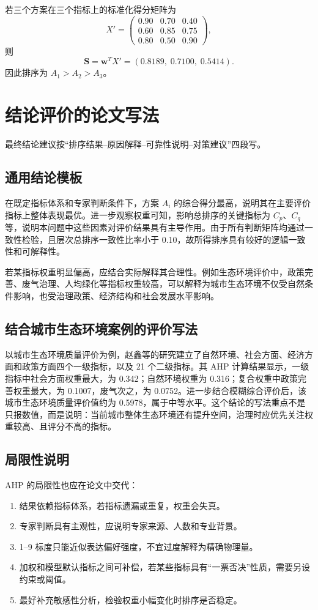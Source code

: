 \documentclass[UTF8,zihao=-4,fontset=none]{ctexart}
\begin{document}
若三个方案在三个指标上的标准化得分矩阵为
\begin{equation}
X'=\begin{pmatrix}
0.90&0.70&0.40\\
0.60&0.85&0.75\\
0.80&0.50&0.90
\end{pmatrix},
\end{equation}
则
\begin{equation}
\bm S=\bm w^T X'=(0.8189,\;0.7100,\;0.5414).
\end{equation}
因此排序为 $A_1>A_2>A_3$。

\section{结论评价的论文写法}
最终结论建议按“排序结果--原因解释--可靠性说明--对策建议”四段写。

\subsection{通用结论模板}
在既定指标体系和专家判断条件下，方案 $A_i$ 的综合得分最高，说明其在主要评价指标上整体表现最优。进一步观察权重可知，影响总排序的关键指标为 $C_p$、$C_q$ 等，说明本问题中这些因素对评价结果具有主导作用。由于所有判断矩阵均通过一致性检验，且层次总排序一致性比率小于 0.10，故所得排序具有较好的逻辑一致性和可解释性。

若某指标权重明显偏高，应结合实际解释其合理性。例如生态环境评价中，政策完善、废气治理、人均绿化等指标权重较高，可以解释为城市生态环境不仅受自然条件影响，也受治理政策、经济结构和社会发展水平影响。

\subsection{结合城市生态环境案例的评价写法}
以城市生态环境质量评价为例，赵鑫等的研究建立了自然环境、社会方面、经济方面和政策方面四个一级指标，以及 21 个二级指标。其 AHP 计算结果显示，一级指标中社会方面权重最大，为 0.342；自然环境权重为 0.316；复合权重中政策完善权重最大，为 0.1007，废气次之，为 0.0752。进一步结合模糊综合评价后，该城市生态环境质量评价值约为 0.5978，属于中等水平。这个结论的写法重点不是只报数值，而是说明：当前城市整体生态环境还有提升空间，治理时应优先关注权重较高、且评分不高的指标。

\subsection{局限性说明}
AHP 的局限性也应在论文中交代：
\begin{enumerate}[leftmargin=2.2em]
  \item 结果依赖指标体系，若指标遗漏或重复，权重会失真。
  \item 专家判断具有主观性，应说明专家来源、人数和专业背景。
  \item 1--9 标度只能近似表达偏好强度，不宜过度解释为精确物理量。
  \item 加权和模型默认指标之间可补偿，若某些指标具有“一票否决”性质，需要另设约束或阈值。
  \item 最好补充敏感性分析，检验权重小幅变化时排序是否稳定。
\end{enumerate}
\end{document}
